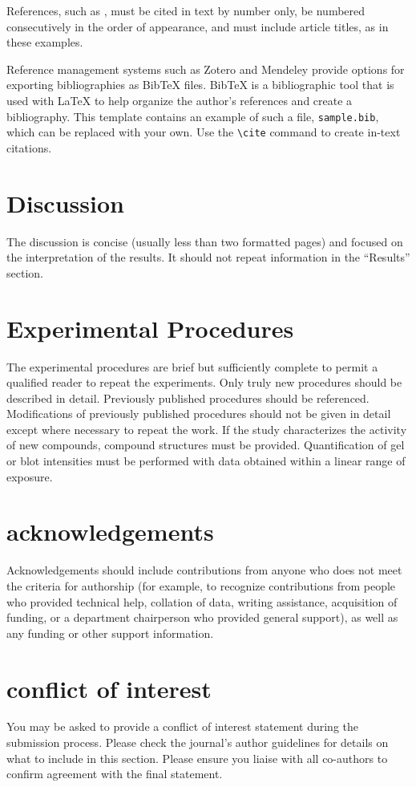 \documentclass[alpha-refs]{wiley-article}
\begin{document}
References, such as \cite{Gregori2012}, must be cited in text by number only, be numbered consecutively in the order of appearance, and must include article titles, as in these examples. 

Reference management systems such as Zotero and Mendeley provide options for exporting bibliographies as Bib\TeX{} files. Bib\TeX{} is a bibliographic tool that is used with \LaTeX{} to help organize the author's references and create a bibliography. This template contains an example of such a file, \texttt{sample.bib}, which can be replaced with your own. Use the \verb|\cite| command  to create in-text citations.

\section{Discussion}

The discussion is concise (usually less than two formatted pages) and focused on the interpretation of the results. It should not repeat information in the ``Results'' section.

\section{Experimental Procedures}

The experimental procedures are brief but sufficiently complete to permit a qualified reader to repeat the experiments. Only truly new procedures should be described in detail. Previously published procedures should be referenced. Modifications of previously published procedures should not be given in detail except where necessary to repeat the work. If the study characterizes the activity of new compounds, compound structures must be provided. Quantification of gel or blot intensities must be performed with data obtained within a linear range of exposure.

\section*{acknowledgements}
Acknowledgements should include contributions from anyone who does not meet the criteria for authorship (for example, to recognize contributions from people who provided technical help, collation of data, writing assistance, acquisition of funding, or a department chairperson who provided general support), as well as any funding or other support information.

\section*{conflict of interest}
You may be asked to provide a conflict of interest statement during the submission process. Please check the journal's author guidelines for details on what to include in this section. Please ensure you liaise with all co-authors to confirm agreement with the final statement.




\end{document}
